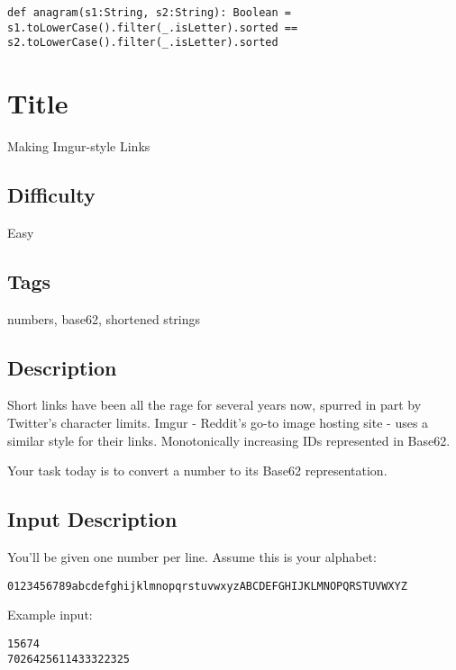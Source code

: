 \begin{verbatim}
def anagram(s1:String, s2:String): Boolean = s1.toLowerCase().filter(_.isLetter).sorted == s2.toLowerCase().filter(_.isLetter).sorted
\end{verbatim}

\section{Title}\label{title-15}

Making Imgur-style Links

\subsection{Difficulty}\label{difficulty-14}

Easy

\subsection{Tags}\label{tags-15}

numbers, base62, shortened strings

\subsection{Description}\label{description-15}

Short links have been all the rage for several years now, spurred in
part by Twitter's character limits. Imgur - Reddit's go-to image hosting
site - uses a similar style for their links. Monotonically increasing
IDs represented in Base62.

Your task today is to convert a number to its Base62 representation.

\subsection{Input Description}\label{input-description-11}

You'll be given one number per line. Assume this is your alphabet:

\begin{verbatim}
0123456789abcdefghijklmnopqrstuvwxyzABCDEFGHIJKLMNOPQRSTUVWXYZ 
\end{verbatim}

Example input:

\begin{verbatim}
15674
7026425611433322325
\end{verbatim}

